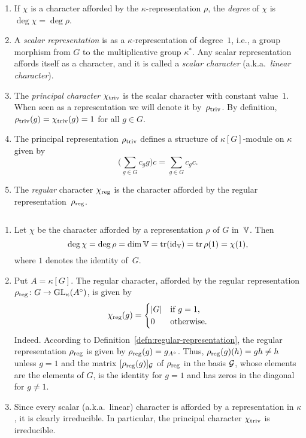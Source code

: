 \begin{defns}\label{defn:scalar-representation}${}$
    \begin{enumerate}[-]
        \item If $\chi$ is a character afforded by the $\kappa$-representation $\rho$, the \textsl{degree} of $\chi$ is $\deg\chi=\deg\rho$.

        \item A \textsl{scalar representation} is as a $\kappa$-representation of degree~$1$, i.e., a group morphism from $G$ to the multiplicative group $\kappa^*$. Any scalar representation affords itself as a character, and it is called a \textsl{scalar character} (a.k.a.~\textsl{linear character}).

        \item The \textsl{principal character} ${\chi}_{\mathrm{triv}}$ is the scalar character with constant value~$1$. When seen as a representation we will denote it by~$\rho_{\mathrm{triv}}$. By definition, $\rho_{\mathrm{triv}}(g)={\chi}_{\mathrm{triv}}(g)=1$ for all $g\in G$.

        \item The principal representation $\rho_{\mathrm{triv}}$ defines a structure of $\kappa[G]$-module on $\kappa$ given by
        $$
            \Big(\sum_{g\in G}c_gg\Big)c = \sum_{g\in G}c_gc.
        $$

        \item The \textsl{regular} character $\chi_{\mathrm{reg}}$ is the character afforded by the regular representation~$\rho_{\mathrm{reg}}$.
    \end{enumerate}
\end{defns}

\begin{rems}${}$\label{rem:chi(1)-is-dim}
    \begin{enumerate}[-]
        \item Let $\chi$ be the character afforded by a representation $\rho$ of $G$ in~$\mathbb V$. Then
        $$
            \deg\chi=\deg\rho=\dim\mathbb V=\operatorname{tr}(\operatorname{id}_\mathbb V)=\operatorname{tr}\rho(1)=\chi(1),
        $$
        where $1$ denotes the identity of~$G$.
    
        \item Put $A=\kappa[G]$. The regular character, afforded by the regular representation $\rho_{\mathrm{reg}}\colon G\to{\rm GL}_\kappa(A^\circ)$, is given by
        $$
            \chi_{\mathrm{reg}}(g) = \begin{cases}
                |G|     &\text{if }g=1,\\
                0       &\text{otherwise.}
            \end{cases}
        $$
        Indeed. According to Definition~\ref{defn:regular-representation}, the regular representation $\rho_{\mathrm{reg}}$ is given by $\rho_{\mathrm{reg}}(g)=g_{A^\circ}$. Thus, $\rho_{\mathrm{reg}}(g)(h)=gh\ne h$ unless $g=1$ and the matrix $[\rho_{\mathrm{reg}}(g)]_{\mathcal G}$ of $\rho_{\mathrm{reg}}$ in the basis $\mathcal G$, whose elements are the elements of $G$, is the identity for $g=1$ and has zeros in the diagonal for $g\ne1$.

        \item Since every scalar (a.k.a.~linear) character is afforded by a representation in $\kappa$, it is clearly irreducible. In particular, the principal character ${\chi}_{\mathrm{triv}}$ is irreducible.
    \end{enumerate}
\end{rems}

